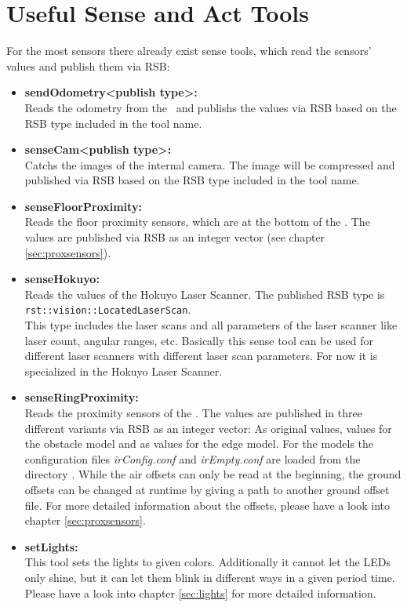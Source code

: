 \section{Useful Sense and Act Tools}
\label{sec:sensetools}

For the most sensors there already exist sense tools, which read the sensors' values and publish them via RSB:
\begin{itemize}
\item {\bf sendOdometry<publish type>:} \\
Reads the odometry from the \diwheel\ and publishs the values via RSB based on the RSB type included in the tool name.

\item {\bf senseCam<publish type>:} \\
Catchs the images of the internal camera. The image will be compressed and published via RSB based on the RSB type included in the tool name.

\item {\bf senseFloorProximity:} \\
Reads the floor proximity sensors, which are at the bottom of the \amiro. The values are published via RSB as an integer vector (see chapter \ref{sec:proxsensors}).

\item {\bf senseHokuyo:} \\
Reads the values of the Hokuyo Laser Scanner. The published RSB type is\\
{\tt rst::vision::LocatedLaserScan}.\\
This type includes the laser scans and all parameters of the laser scanner like laser count, angular ranges, etc. Basically this sense tool can be used for different laser scanners with different laser scan parameters. For now it is specialized in the Hokuyo Laser Scanner.

\item {\bf senseRingProximity:} \\
Reads the proximity sensors of the \proxring. The values are published in three different variants via RSB as an integer vector: As original values, values for the obstacle model and as values for the edge model. For the models the configuration files {\it irConfig.conf} and {\it irEmpty.conf} are loaded from the directory \amirohomepathI\initialnameI. While the air offsets can only be read at the beginning, the ground offsets can be changed at runtime by giving a path to another ground offset file. For more detailed information about the offsets, please have a look into chapter \ref{sec:proxsensors}.

\item {\bf setLights:} \\
This tool sets the lights to given colors. Additionally it cannot let the LEDs only shine, but it can let them blink in different ways in a given period time. Please have a look into chapter \ref{sec:lights} for more detailed information.
\end{itemize}

